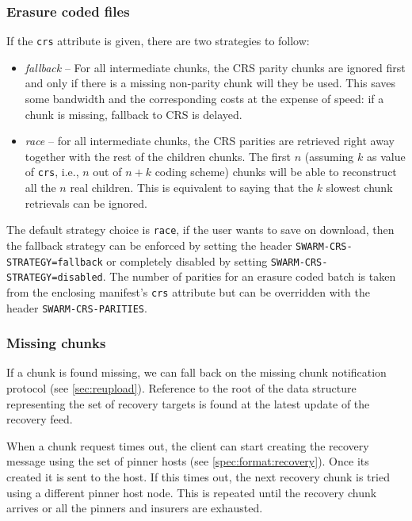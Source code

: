 \subsubsection{Erasure coded files}

If the \lstinline{crs} attribute is given, there are two strategies to follow: 

\begin{itemize}
\item \emph{fallback} -- For all intermediate chunks, the CRS parity chunks are ignored first and only if there is a missing non-parity chunk will they be used. This saves some bandwidth and the corresponding costs at the expense of speed: if a chunk is missing, fallback to CRS is delayed.
\item \emph{race} -- for all intermediate chunks, the CRS parities are retrieved right away together with the rest of the children chunks. The first $n$ (assuming $k$ as value of \lstinline{crs}, i.e., $n$ out of $n+k$ coding scheme) chunks will be able to reconstruct all the $n$ real children. This is equivalent to saying that the $k$ slowest chunk retrievals can be ignored.  
\end{itemize}

The default strategy choice is \lstinline{race}, if the user wants to save on download, then the fallback strategy can be enforced by setting the header \lstinline{SWARM-CRS-STRATEGY=fallback} or completely disabled by setting \lstinline{SWARM-CRS-STRATEGY=disabled}. The number of parities for an erasure coded batch is taken from the enclosing manifest's \lstinline{crs} attribute but can be overridden with the header \lstinline{SWARM-CRS-PARITIES}.

\subsubsection{Missing chunks}

If a chunk is found missing, we can fall back on the missing chunk notification protocol (see \ref{sec:reupload}). Reference to the root of the data structure representing the set of recovery targets is found at the latest update of the recovery feed. 

When a chunk request times out, the client can start creating the recovery message using the set of pinner hosts (see \ref{spec:format:recovery}). Once its created it is sent to the host. If this times out, the next recovery chunk is tried using a different pinner host node. This is repeated until the recovery chunk arrives or all the pinners and insurers are exhausted.

